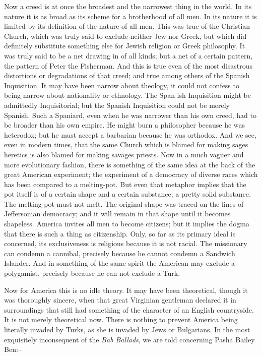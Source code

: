 \documentclass{book}
\begin{document}
Now a creed is at once the broadest and the narrowest thing in the world. In its nature it is as broad as its scheme for a brotherhood of all men. In its nature it is limited by its definition of the nature of all men. This was true of the Christian Church, which was truly said to exclude neither Jew nor Greek, but which did definitely substitute something else for Jewish religion or Greek philosophy. It was truly said to be a net drawing in of all kinds; but a net of a certain pattern, the pattern of Peter the Fisherman. And this is true even of the most disastrous distortions or degradations of that creed; and true among others of the Spanish Inquisition. It may have been narrow about theology, it could not confess to being narrow about nationality or ethnology. The Span ish Inquisition might be admittedly Inquisitorial; but the Spanish Inquisition could not be merely Spanish. Such a Spaniard, even when he was narrower than his own creed, had to be broader than his own empire. He might burn a philosopher because he was heterodox; but he must accept a barbarian because he was orthodox. And we see, even in modern times, that the same Church which is blamed for making sages heretics is also blamed for making savages priests. Now in a much vaguer and more evolutionary fashion, there is something of the same idea at the back of the great American experiment; the experiment of a democracy of diverse races which has been compared to a melting-pot. But even that metaphor implies that the pot itself is of a certain shape and a certain substance; a pretty solid substance. The melting-pot must not melt. The original shape was traced on the lines of Jeffersonian democracy; and it will remain in that shape until it becomes shapeless. America invites all men to become citizens; but it implies the dogma that there is such a thing as citizenship. Only, so far as its primary ideal is concerned, its exclusiveness is religious because it is not racial. The missionary can condemn a cannibal, precisely because he cannot condemn a Sandwich Islander. And in something of the same spirit the American may exclude a polygamist, precisely because he can not exclude a Turk.

Now for America this is no idle theory. It may have been theoretical, though it was thoroughly sincere, when that great Virginian gentleman declared it in surroundings that still had something of the character of an English countryside. It is not merely theoretical now. There is nothing to prevent America being literally invaded by Turks, as she is invaded by Jews or Bulgarians. In the most exquisitely inconsequent of the \emph{Bab Ballads}, we are told concerning Pasha Bailey Ben:–
\end{document}
